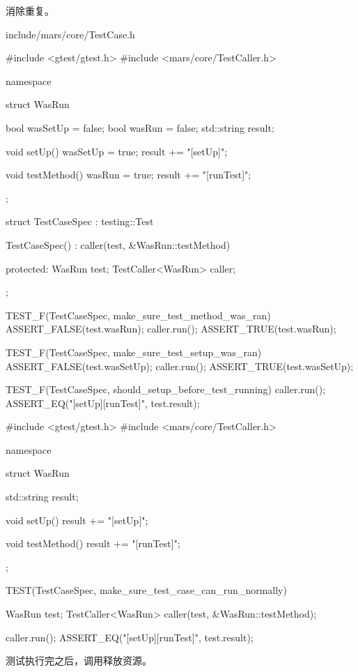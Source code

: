 消除重复。

\begin{diff}{include/mars/core/TestCase.h}
\begin{minicpp}
#include <gtest/gtest.h>
#include <mars/core/TestCaller.h>

namespace {
  struct WasRun {
    bool wasSetUp = false;
    bool wasRun = false;
    std::string result;

    void setUp() {
      wasSetUp = true;
      result += "[setUp]";
    }

    void testMethod() {
      wasRun = true;
      result += "[runTest]";
    }
  };

  struct TestCaseSpec : testing::Test {
    TestCaseSpec()
      : caller(test, &WasRun::testMethod) {
    }

  protected:
    WasRun test;
    TestCaller<WasRun> caller;
  };
}

TEST_F(TestCaseSpec, make_sure_test_method_was_ran) {
  ASSERT_FALSE(test.wasRun);
  caller.run();
  ASSERT_TRUE(test.wasRun);
}

TEST_F(TestCaseSpec, make_sure_test_setup_was_ran) {
  ASSERT_FALSE(test.wasSetUp);
  caller.run();
  ASSERT_TRUE(test.wasSetUp);
}

TEST_F(TestCaseSpec, should_setup_before_test_running) {
  caller.run();
  ASSERT_EQ("[setUp][runTest]", test.result);
}
\end{minicpp}
\tcblower
\begin{minicpp}
#include <gtest/gtest.h>
#include <mars/core/TestCaller.h>

namespace {
  struct WasRun {
    std::string result;

    void setUp() {
      result += "[setUp]";
    }

    void testMethod() {
      result += "[runTest]";
    }
  };
}

TEST(TestCaseSpec, make_sure_test_case_can_run_normally) {
  WasRun test;
  TestCaller<WasRun> caller(test, &WasRun::testMethod);

  caller.run();
  ASSERT_EQ("[setUp][runTest]", test.result);
}
\end{minicpp}
\end{diff}


测试执行完之后，调用释放资源。


